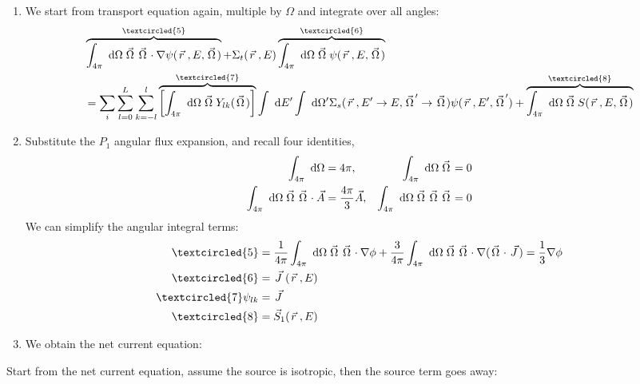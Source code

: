 \documentclass{school-22.211-notes}
\begin{document}
\clearpage
{}
\begin{enumerate}
\item We start from transport equation again, multiple by $\Omega$ and integrate over all angles: 
\begin{align}
& \overbrace{\int_{4\pi} \dOmega \vecOmega \vecOmega \cdot \gradient \psi(\vecr, E, \vecOmega)}^{\textcircled{5}} 
+ \Sigma_t (\vecr, E) \overbrace{\int_{4\pi} \dOmega \vecOmega \psi(\vecr, E, \vecOmega)}^{\textcircled{6}} \\
&= \Sum_i \Sum_{l=0}^L \Sum_{k=-l}^l \overbrace{\left[\int_{4\pi} \dOmega \vecOmega Y_{lk} (\vecOmega) \right]}^{\textcircled{7}} \int \dE' \int \dOmega' \Sigma_s(\vecr, E'\to E, \vecOmega' \to \vecOmega) \psi(\vecr, E', \vecOmega') + \overbrace{\int_{4\pi} \dOmega \vecOmega S(\vecr, E, \vecOmega)}^{\textcircled{8}} 
\end{align}

\item Substitute the $P_1$ angular flux expansion, 
and recall four identities,
\begin{align}
\int_{4\pi} \mbox{ }\mathrm{d} \Omega &= 4 \pi, & \int_{4\pi} \mbox{ }\mathrm{d} \Omega \left.\vec{\Omega}\right. &= 0 \\
\int_{4\pi} \mbox{ }\mathrm{d} \Omega \left.\vec{\Omega}\right. \left.\vec{\Omega}\right. \cdot \vec{A} &= \frac{4\pi}{3} \vec{A}, & \int_{4\pi} \mbox{ }\mathrm{d} \Omega \left.\vec{\Omega}\right. \left.\vec{\Omega}\right. \left.\vec{\Omega}\right. &= 0 
\end{align}
We can simplify the angular integral terms:
\begin{align}
\textcircled{5} &= \frac{1}{4\pi} \int_{4\pi} \dOmega \vecOmega \vecOmega \cdot \gradient \phi + \frac{3}{4\pi} \int_{4\pi} \dOmega \vecOmega \vecOmega \cdot \gradient (\vecOmega \cdot \vecJ) = \frac{1}{3} \gradient \phi \\
\textcircled{6} &= \vecJ (\vecr, E) \\
\textcircled{7} \psi_{lk} &= \vecJ \\
\textcircled{8} &= \vec{S}_1 (\vecr, E) 
\end{align}

\item We obtain the net current equation:
\end{enumerate}


\clearpage
{}
Start from the net current equation, assume the source is isotropic, then the source term goes away:
\end{document}
